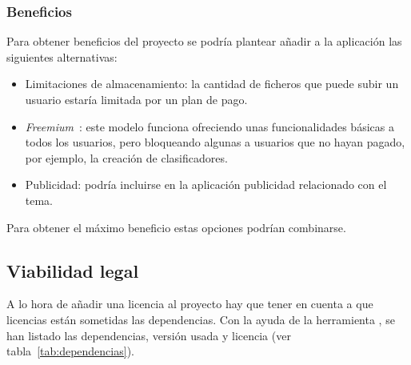 \subsubsection{Beneficios}

Para obtener beneficios del proyecto se podría plantear añadir a la aplicación 
las siguientes alternativas:
\begin{itemize}
	\item Limitaciones de almacenamiento: la cantidad de ficheros que puede 
	subir un usuario estaría limitada por un plan de pago.
	\item \textit{Freemium}~\cite{wiki:freemium}: este modelo funciona 
	ofreciendo unas funcionalidades básicas a todos los usuarios, pero 
	bloqueando algunas a usuarios que no hayan pagado, por ejemplo, la creación 
	de clasificadores.
	\item Publicidad: podría incluirse en la aplicación publicidad relacionado 
	con el tema.
\end{itemize}

Para obtener el máximo beneficio estas opciones podrían combinarse.

\subsection{Viabilidad legal}

A lo hora de añadir una licencia al proyecto hay que tener en cuenta a que 
licencias están sometidas las dependencias. Con la ayuda de la herramienta 
, se han listado las 
dependencias, versión usada y licencia (ver tabla~\ref{tab:dependencias}).

